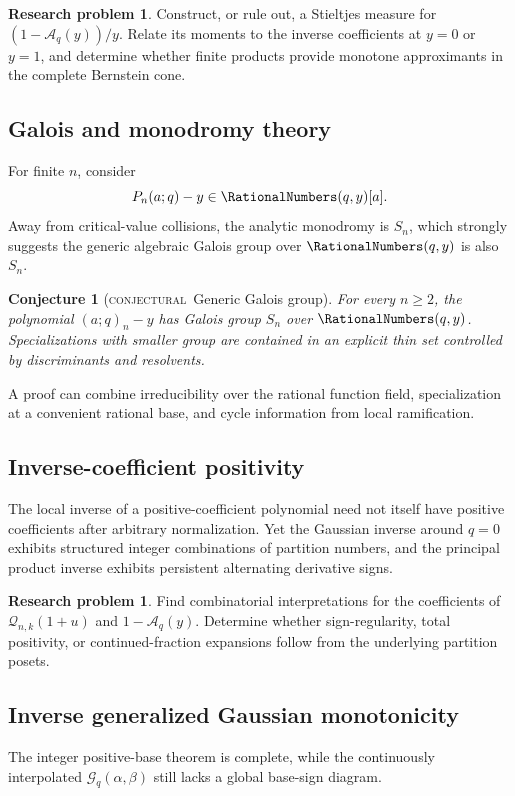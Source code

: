 \documentclass[11pt,oneside]{article}
\newtheorem{conjecture}[theorem]{Conjecture}
\theoremstyle{definition}
\theoremstyle{remark}
\theoremstyle{plain}
\theoremstyle{definition}
\newtheorem{researchproblem}[theorem]{Research problem}
\theoremstyle{remark}
\newcommand{\Aq}{\mathcal A_q}
\newcommand{\statusconjectural}{\textcolor{conjectureorange}{\textsc{conjectural}}}
\numberwithin{equation}{section}
\numberwithin{figure}{section}
\numberwithin{table}{section}
\let\reportsubsection\subsection
\let\reportsubsubsection\subsubsection
\let\section\reportsubsection
\let\subsection\reportsubsubsection
\begin{document}
\begin{researchproblem}
Construct, or rule out, a Stieltjes measure for \((1-\Aq(y))/y\).  Relate its
moments to the inverse coefficients at \(y=0\) or \(y=1\), and determine
whether finite products provide monotone approximants in the complete
Bernstein cone.
\end{researchproblem}

\section{Galois and monodromy theory}
For finite \(n\), consider
\[
 P_n(a;q)-y\in\RationalNumbers(q,y)[a].
\]
Away from critical-value collisions, the analytic monodromy is \(S_n\), which
strongly suggests the generic algebraic Galois group over \(\RationalNumbers(q,y)\) is also
\(S_n\).

\begin{conjecture}[\statusconjectural\ Generic Galois group]
For every \(n\ge2\), the polynomial \((a;q)_n-y\) has Galois group \(S_n\) over
\(\RationalNumbers(q,y)\).  Specializations with smaller group are contained in an explicit
thin set controlled by discriminants and resolvents.
\end{conjecture}
A proof can combine irreducibility over the rational function field,
specialization at a convenient rational base, and cycle information from local
ramification.

\section{Inverse-coefficient positivity}
The local inverse of a positive-coefficient polynomial need not itself have
positive coefficients after arbitrary normalization.  Yet the Gaussian
inverse around \(q=0\) exhibits structured integer combinations of partition
numbers, and the principal product inverse exhibits persistent alternating
derivative signs.

\begin{researchproblem}
Find combinatorial interpretations for the coefficients of
\(\mathcal Q_{n,k}(1+u)\) and \(1-\Aq(y)\).  Determine whether sign-regularity,
total positivity, or continued-fraction expansions follow from the underlying
partition posets.
\end{researchproblem}

\section{Inverse generalized Gaussian monotonicity}
The integer positive-base theorem is complete, while the continuously
interpolated \(\mathcal G_q(\alpha,\beta)\) still lacks a global base-sign
diagram.
\end{document}
